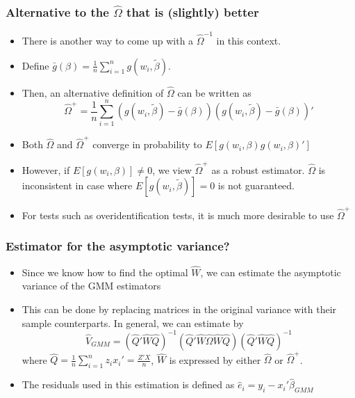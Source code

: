 \documentclass[aspectratio=169]{beamer}
\begin{document}
\begin{frame}
\frametitle{Alternative to the $\widehat{\Omega}$ that is (slightly) better}
\begin{itemize}
\item There is another way to come up with a $\widehat{\Omega}^{-1}$ in this context. 
\item Define $\bar{g}(\beta)=\frac{1}{n}\sum_{i=1}^ng(w_i,\tilde{\beta})$. 
\item Then, an alternative definition of $\widehat{\Omega}$ can be written as
\[
\widehat{\Omega}^+=\frac{1}{n}\sum_{i=1}^n(g(w_i,\tilde{\beta})-\bar{g}(\beta))(g(w_i,\tilde{\beta})-\bar{g}(\beta))'
\]
\item Both $\widehat{\Omega}$ and $\widehat{\Omega}^+$ converge in probability to $E[g(w_i,\beta)g(w_i,\beta)']$
\item However, if $E[g(w_i, \beta)]\neq0$, we view $\widehat{\Omega}^+$ as a robust estimator. $\widehat{\Omega}$ is inconsistent in case where $E[g(w_i,\tilde{\beta})]=0$ is not guaranteed.
\item For tests such as overidentification tests, it is much more desirable to use $\widehat{\Omega}^+$
\end{itemize}
\end{frame}

\begin{frame}
\frametitle{Estimator for the asymptotic variance?}
\begin{itemize}
\item Since we know how to find the optimal $\widehat{W}$, we can estimate the asymptotic variance of the GMM estimators
\item This can be done by replacing matrices in the original variance with their sample counterparts. In general, we can estimate by
\[
\widehat{V}_{GMM}=\left(\widehat{Q}'\widehat{W}\widehat{Q}\right)^{-1}\left(\widehat{Q}'\widehat{W}\widehat{\Omega}\widehat{W}\widehat{Q}\right)\left(\widehat{Q}'\widehat{W}\widehat{Q}\right)^{-1}
\]
where $\widehat{Q}=\frac{1}{n}\sum_{i=1}^n z_ix_i' = \frac{Z'X}{n}$, $\widehat{W}$ is expressed by either $\widehat{\Omega}$ or $\widehat{\Omega}^+$. 
\item The residuals used in this estimation is defined as $\hat{e}_i = y_i- x_i'\hat{\beta}_{GMM}$
\end{itemize}
\end{frame}

\end{document}
